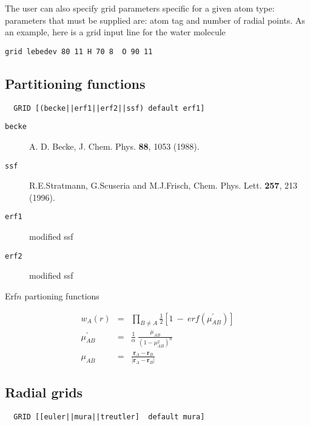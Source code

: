 The user can also specify grid parameters specific for a given atom type: 
parameters that must be supplied are: atom tag and number of radial points.
As an example, here is a grid input line for the water molecule
\begin{verbatim}
grid lebedev 80 11 H 70 8  O 90 11 
\end{verbatim}



\clearpage
\subsection{Partitioning functions}

\begin{verbatim}
  GRID [(becke||erf1||erf2||ssf) default erf1]
\end{verbatim}


\begin{description}
\item[\tt becke]  A. D. Becke, J. Chem. Phys. {\bf 88}, 1053 (1988).
\item[\tt ssf] R.E.Stratmann, G.Scuseria and  M.J.Frisch,
Chem. Phys. Lett. {\bf 257}, 213 (1996).
\item[\tt erf1] modified ssf
\item[\tt erf2] modified ssf
\end{description}

Erf$n$ partioning functions

\begin{eqnarray*}
 w_A(r) & = & \prod_{B\neq A}\frac{1}{2} \left[1 \ - \
erf(\mu^\prime_{AB})\right] \\
 \mu^\prime_{AB} & = & \frac{1}{\alpha} \ \frac{\mu_{AB}}{(1-\mu_{AB}^2)^n}\\
 \mu_{AB} & = & \frac{{\mathbf r}_A - {\mathbf r}_B}
{\left|{\mathbf r}_A - {\mathbf r}_B \right|}
\end{eqnarray*}




\subsection{Radial grids}

\begin{verbatim}
  GRID [[euler||mura||treutler]  default mura]
\end{verbatim}

